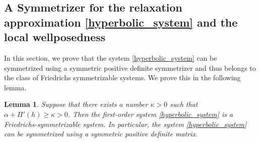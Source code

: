 \documentclass[11pt]{article}
\numberwithin{equation}{section}
\newtheorem{lemma}[theorem]{Lemma}
\newtheorem{counter example}[theorem]{Counter Example}
\numberwithin{equation}{section}
\numberwithin{equation}{section}
\begin{document}
\subsection{A Symmetrizer for the relaxation approximation \eqref{hyperbolic_system} and the local wellposedness}
In this section, we prove that the system \eqref{hyperbolic_system} can be symmetrized using a symmetric positive definite symmetrizer and thus belongs to the class of Friedrichs symmetrizable systems. We prove this in the following lemma.
\begin{lemma}\label{symmetrizer}
Suppose that there exists a number
\(\kappa>0\) such that $\alpha+\Pi'(h)\geq \kappa>0$. Then the first-order system \eqref{hyperbolic_system} is a Friedrichs-symmetrizable system. In particular, the system \eqref{hyperbolic_system} can be symmetrized using a symmetric positive definite matrix.
\end{lemma}
\end{document}
